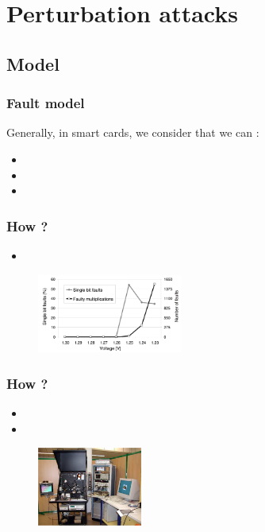 \documentclass{beamer}
\begin{document}
\section{Perturbation attacks}
    \subsection{Model}

    \begin{frame}
        \frametitle{Fault model}
            Generally, in smart cards, we consider that we can :
            \begin{itemize}
                \item {}
                \item {}
                \item {}
            \end{itemize}
    \end{frame}

    \begin{frame}
        \frametitle{How ?}
            \begin{itemize}
                \item {}
            \end{itemize}
            
            \begin{figure}
                \centering
                \includegraphics[width=180px]{img/power_disturbation}
            \end{figure}

    \end{frame}

    \begin{frame}
        \frametitle{How ?}
            \begin{itemize}
                \item {}
                \item \color{black}{With a laser}
            \end{itemize}
            
            \begin{figure}
                \centering
                \includegraphics[width=130px]{img/laser}
            \end{figure}

    \end{frame}
\end{document}
